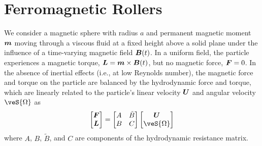 



\section{Ferromagnetic Rollers}

We consider a magnetic sphere with radius $a$ and permanent magnetic moment $\boldsymbol{m}$ moving through a viscous fluid at a fixed height above a solid plane under the influence of a time-varying magnetic field $\boldsymbol{B}(t)$. In a uniform field, the particle experiences a magnetic torque, $\boldsymbol{L}=\boldsymbol{m}\times\boldsymbol{B}(t)$, but no magnetic force, $\boldsymbol{F}=0$. In the absence of inertial effects (i.e., at low Reynolds number), the magnetic force and torque on the particle are balanced by the hydrodynamic force and torque, which are linearly related to the particle's linear velocity $\boldsymbol{U}$ and angular velocity $\veS{\Omega}$ as
\begin{equation}
    \begin{bmatrix} \ve{F} \\ \ve{L} \end{bmatrix} = \begin{bmatrix} A & \tilde{B} \\ B & C \end{bmatrix}  \begin{bmatrix} \ve{U} \\ \veS{\Omega} \end{bmatrix} \label{eq:dynamics}
\end{equation}
where $A$, $B$, $\tilde{B}$, and $C$ are components of the hydrodynamic resistance matrix.  

